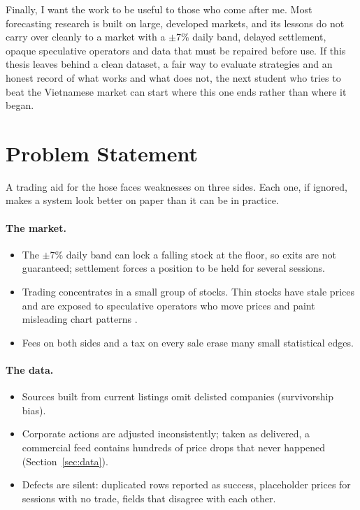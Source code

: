 Finally, I want the work to be useful to those who come after me. Most forecasting research is
built on large, developed markets, and its lessons do not carry over cleanly to a market with a
$\pm7\%$ daily band, delayed settlement, opaque speculative operators and data that must be
repaired before use. If this thesis leaves behind a clean dataset, a fair way to evaluate
strategies and an honest record of what works and what does not, the next student who tries to
beat the Vietnamese market can start where this one ends rather than where it began.

\section{Problem Statement}

A trading aid for the \gls{hose} faces weaknesses on three sides. Each one, if ignored, makes a
system look better on paper than it can be in practice.

\paragraph{The market.}
\begin{itemize}
  \item The $\pm7\%$ daily band can lock a falling stock at the floor, so exits are not
    guaranteed; settlement forces a position to be held for several sessions.
  \item Trading concentrates in a small group of stocks. Thin stocks have stale prices and are
    exposed to speculative operators who move prices and paint misleading chart patterns
    \citep{allen1992manipulation,aggarwal2006manipulation}.
  \item Fees on both sides and a tax on every sale erase many small statistical edges.
\end{itemize}

\paragraph{The data.}
\begin{itemize}
  \item Sources built from current listings omit delisted companies (survivorship bias).
  \item Corporate actions are adjusted inconsistently; taken as delivered, a commercial feed
    contains hundreds of price drops that never happened (Section~\ref{sec:data}).
  \item Defects are silent: duplicated rows reported as success, placeholder prices for
    sessions with no trade, fields that disagree with each other.
\end{itemize}

